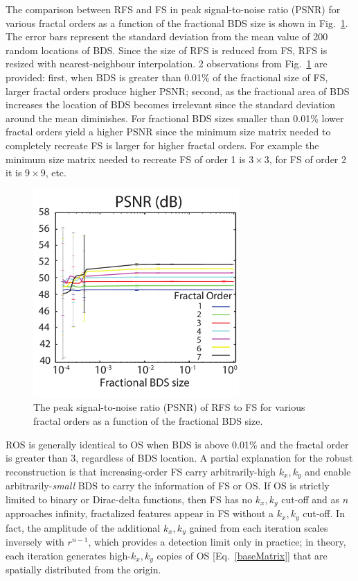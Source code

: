 The comparison between RFS and FS in peak signal-to-noise ratio (PSNR) for various fractal orders as a function of the fractional BDS size is shown in Fig.~\ref{PSNR}. The error bars represent the standard deviation from the mean value of 200 random locations of BDS. Since the size of RFS is reduced from FS, RFS is resized with nearest-neighbour interpolation. 2 observations from Fig.~\ref{PSNR} are provided: first, when BDS is greater than 0.01\% of the fractional size of FS, larger fractal orders produce higher PSNR; second, as the fractional area of BDS increases the location of BDS becomes irrelevant since the standard deviation around the mean diminishes. For fractional BDS sizes smaller than 0.01\% lower fractal orders yield a higher PSNR since the minimum size matrix needed to completely recreate FS is larger for higher fractal orders. For example the minimum size matrix needed to recreate FS of order 1 is $3\times 3$, for FS of order 2 it is $9\times 9$, etc. 

\begin{figure}[t!]
\begin{centering}
 \includegraphics[width=0.7\textwidth]{psnr_good_eb2.pdf}
\caption{The peak signal-to-noise ratio (PSNR) of RFS to FS for various fractal orders as a function of the fractional BDS size.}
\label{PSNR}
\end{centering}
\end{figure}

ROS is generally identical to OS when BDS is above 0.01\% and the fractal order is greater than 3, regardless of BDS location. A partial explanation for the robust reconstruction is that increasing-order FS carry arbitrarily-high $k_x,k_y$ and enable arbitrarily-{\it small} BDS to carry the information of FS or OS.  If OS is strictly limited to binary or Dirac-delta functions, then FS has no $k_x,k_y$ cut-off and as $n$ approaches infinity, fractalized features appear in FS without a $k_x,k_y$ cut-off.  In fact, the amplitude of the additional $k_x,k_y$ gained from each iteration scales inversely with $r^{n-1}$, which provides a detection limit only in practice; in theory, each iteration generates high-$k_x,k_y$ copies of OS [Eq.~\ref{baseMatrix}] that are spatially distributed from the origin.  

